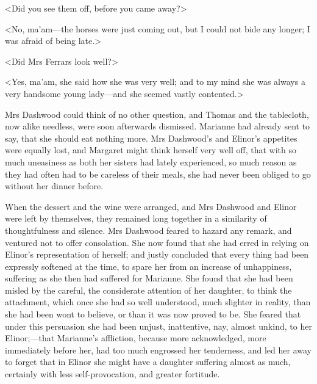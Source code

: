 <Did you see them off, before you came away?>

<No, ma'am—the horses were just coming out, but I could not bide any longer; I was afraid of being late.>

<Did Mrs Ferrars look well?>

<Yes, ma'am, she said how she was very well; and to my mind she was always a very handsome young lady—and she seemed vastly contented.>

Mrs Dashwood could think of no other question, and Thomas and the tablecloth, now alike needless, were soon afterwards dismissed. Marianne had already sent to say, that she should eat nothing more. Mrs Dashwood's and Elinor's appetites were equally lost, and Margaret might think herself very well off, that with so much uneasiness as both her sisters had lately experienced, so much reason as they had often had to be careless of their meals, she had never been obliged to go without her dinner before.

When the dessert and the wine were arranged, and Mrs Dashwood and Elinor were left by themselves, they remained long together in a similarity of thoughtfulness and silence. Mrs Dashwood feared to hazard any remark, and ventured not to offer consolation. She now found that she had erred in relying on Elinor's representation of herself; and justly concluded that every thing had been expressly softened at the time, to spare her from an increase of unhappiness, suffering as she then had suffered for Marianne. She found that she had been misled by the careful, the considerate attention of her daughter, to think the attachment, which once she had so well understood, much slighter in reality, than she had been wont to believe, or than it was now proved to be. She feared that under this persuasion she had been unjust, inattentive, nay, almost unkind, to her Elinor;—that Marianne's affliction, because more acknowledged, more immediately before her, had too much engrossed her tenderness, and led her away to forget that in Elinor she might have a daughter suffering almost as much, certainly with less self-provocation, and greater fortitude.